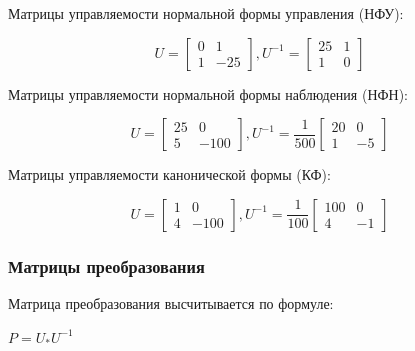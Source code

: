 \documentclass[14pt,a4paper,report]{report}
\begin{document}
Матрицы управляемости нормальной формы управления (НФУ):

\begin{equation*}
\text{$U=\begin{bmatrix} 0 & 1 \\ 1 & -25 \end{bmatrix}$}
\text{$, U^{-1}=\begin{bmatrix} 25 & 1 \\ 1 & 0 \end{bmatrix}$}
\end{equation*}

Матрицы управляемости нормальной формы наблюдения (НФН):

\begin{equation*}
\text{$U=\begin{bmatrix} 25 & 0 \\ 5 & -100 \end{bmatrix}$}
\text{$, U^{-1}=\frac{1}{500}\begin{bmatrix} 20 & 0 \\ 1 & -5 \end{bmatrix}$}
\end{equation*}

Матрицы управляемости канонической формы (КФ):

\begin{equation*}
\text{$U=\begin{bmatrix} 1 & 0 \\ 4 & -100 \end{bmatrix}$}
\text{$, U^{-1}=\frac{1}{100}\begin{bmatrix} 100 & 0 \\ 4 & -1 \end{bmatrix}$}
\end{equation*}

\subsubsection{Матрицы преобразования}

Матрица преобразования высчитывается по формуле:

\begin{center}
$P=U_{*}U^{-1}$
\end{center}
\end{document}
